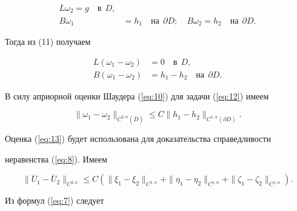\begin{pf}
\begin{equation}
\begin{split}
L\omega _2=g \quad \text{в} \ \ D, \\


B\omega_1 &= h_1 \quad \text{на} \ \ \partial D;\quad


B\omega _2=h_2 \quad \text{на} \ \ \partial D.


\end{split}


\end{equation}


Тогда из (11) получаем


\begin{equation}\label{eq:12}


\begin{split}


L ({\omega _1 - \omega _2 }) &= 0 \quad \text{в} \ \ D, \\


B ({\omega _1 - \omega _2 }) &= h_1 - h_2 \quad \text{на}\ \ \partial D.


\end{split}


\end{equation}


В силу априорной оценки Шаудера (\ref{eq:10}) для задачи (\ref{eq:12}) имеем


\begin{equation}\label{eq:13}


\| {\omega_1 - \omega_2 } \|_{C^{2,\alpha } ({\overline 


D })} \le C \| {h_1 - h_2 } \|_{C^{1,\alpha } (


{\partial D})}.


\end{equation}


Оценка (\ref{eq:13}) будет использована для доказательства справедливости


неравенства (\ref{eq:8}). Имеем


\begin{equation}\label{eq:14}


\| {\overline U _1 - \overline U _2 } \|_{C^{2,\alpha }} \le 


C ({ \| {\xi _1 - \xi _2 } \|_{C^{1,\alpha }}+\| {\eta_1 -


\eta _2 } \|_{C^{1,\alpha }}+\| {\zeta _1 - \zeta _2 } 


\|_{C^{1,\alpha }} }).


\end{equation}


Из формул (\ref{eq:7}) следует



\end{pf}
